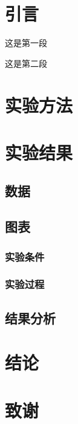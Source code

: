 \documentclass[a4paper, oneside]{ctexart}
\begin{document}
	\section{引言}
		这是第一段
		  
		这是第二段
	\section{实验方法}
	\section{实验结果}
		\subsection{数据}
		\subsection{图表}
			\subsubsection{实验条件}
			\subsubsection{实验过程}
		\subsection{结果分析}
	\section{结论}
	\section{致谢}
\end{document}
